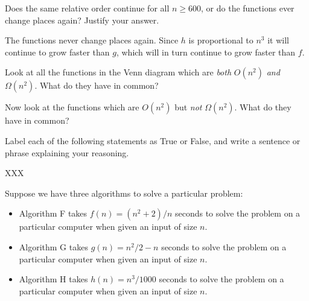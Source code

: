 \documentclass{tufte-handout}
\begin{document}
\begin{questions}
\item Does the same relative order continue for all $n \geq 600$, or do
  the functions ever change places again?  Justify your answer.
  \begin{answer}The functions never change places again.  Since $h$
    is proportional to $n^3$ it will continue to grow faster than
    $g$, which will in turn continue to grow faster than
    $f$.\end{answer}

\item Look at all the functions in the Venn diagram which are
  \emph{both} $O(n^2)$ \emph{and} $\Omega(n^2)$.  What do they have in
  common?

\item Now look at the functions which are $O(n^2)$ but \emph{not}
  $\Omega(n^2)$.  What do they have in common?

\item Label each of the following statements as True or False, and
  write a sentence or phrase explaining your reasoning.
  \begin{subquestions}
  \item XXX
  \end{subquestions}

\item Suppose we have three algorithms to solve a particular problem:
  \begin{itemize}
  \item Algorithm F takes $f(n) = (n^2 + 2)/n$ seconds to solve
    the problem on a particular computer when given an input of size $n$.
  \item Algorithm G takes $g(n) = n^2/2 - n$ seconds to solve
    the problem on a particular computer when given an input of size $n$.
  \item Algorithm H takes $h(n) = n^3/1000$ seconds to solve
    the problem on a particular computer when given an input of size $n$.
  \end{itemize}


\end{questions}
\end{document}
